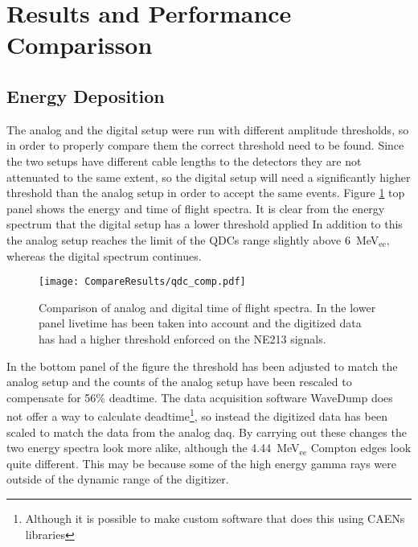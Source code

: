 \documentclass[main.tex]{subfiles}
\begin{document}
\section{Results and Performance Comparisson}\label{sec:results}
\subsection{Energy Deposition}

The analog and the digital setup were run with different amplitude thresholds, so in order to properly compare them the correct threshold need to be found. Since the two setups have different cable lengths to the detectors they are not attenuated to the same extent, so the digital setup will need a significantly higher threshold than the analog setup in order to accept the same events. Figure \ref{fig:qdc_comp} top panel shows the energy and time of flight spectra. It is clear from the energy spectrum that the digital setup has a lower threshold applied In addition to this the analog setup reaches the limit of the QDCs range slightly above \SI{6}{\MeV}$_\text{ee}$, whereas the digital spectrum continues. 

\begin{figure}[h]
    \centering
        \texttt{[image: CompareResults/qdc\_comp.pdf]}
        \caption{Comparison of analog and digital time of flight spectra. In the lower panel livetime has been taken into account and the digitized data has had a higher threshold enforced on the NE213 signals.}
    \label{fig:qdc_comp}
\end{figure}

In the bottom panel of the figure the threshold has been adjusted to match the analog setup and the counts of the analog setup have been rescaled to compensate for 56\% deadtime. The data acquisition software WaveDump does not offer a way to calculate deadtime\footnote{Although it is possible to make custom software that does this using CAENs libraries}, so instead the digitized data has been scaled to match the data from the analog daq. By carrying out these changes the two energy spectra look more alike, although the \SI{4.44}{\MeV}$_\text{ee}$ Compton edges look quite different. This may be because some of the high energy gamma rays were outside of the dynamic range of the digitizer.
\end{document}
